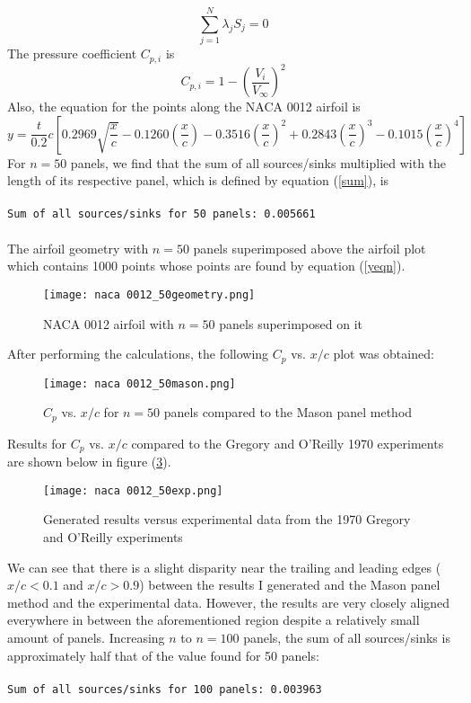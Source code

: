 \documentclass[12pt]{article}
\begin{document}
\begin{equation}
    \label{sum}
    \sum_{j = 1}^{N}\lambda_j S_j = 0
\end{equation}
The pressure coefficient $C_{p,i}$ is
\begin{equation}
    C_{p,i} = 1 - \left(\frac{V_i}{V_\infty} \right)^2
\end{equation}
Also, the equation for the points along the NACA 0012 airfoil is 
\begin{equation} \label{yeqn}
    y = \frac{t}{0.2}c\left[0.2969\sqrt{\frac{x}{c}} - 0.1260\left(\frac{x}{c} \right) - 0.3516\left(\frac{x}{c} \right)^2 + 0.2843\left(\frac{x}{c} \right)^3 - 0.1015\left(\frac{x}{c} \right)^4 \right]
\end{equation}
For $n = 50$ panels, we find that the sum of all sources/sinks multiplied with the length of its respective panel, which is defined by equation (\ref{sum}), is \\ \\
\texttt{Sum of all sources/sinks for 50 panels: 0.005661} \\ \\
The airfoil geometry with $n = 50$ panels superimposed above the airfoil plot which contains 1000 points whose points are found by equation (\ref{yeqn}).
\begin{figure}[H]
    \centering
    \texttt{[image: naca 0012\_50geometry.png]}
    \caption{NACA 0012 airfoil with $n = 50$ panels superimposed on it}
    \label{fig:50geo}
\end{figure}
\noindent After performing the calculations, the following $C_p$ vs. $x/c$ plot was obtained:
\begin{figure}[H]
    \centering
    \texttt{[image: naca 0012\_50mason.png]}
    \caption{$C_p$ vs. $x/c$ for $n = 50$ panels compared to the Mason panel method}
    \label{fig:mason50}
\end{figure}
\noindent Results for $C_p$ vs. $x/c$ compared to the Gregory and O'Reilly 1970 experiments are shown below in figure (\ref{50oreilly}).
\begin{figure}[H]
    \centering
    \texttt{[image: naca 0012\_50exp.png]}
    \caption{Generated results versus experimental data from the 1970 Gregory and O'Reilly experiments}
    \label{50oreilly}
\end{figure}
\noindent We can see that there is a slight disparity near the trailing and leading edges ($x/c < 0.1$ and $x/c > 0.9$) between the results I generated and the Mason panel method and the experimental data. However, the results are very closely aligned everywhere in between the aforementioned region despite a relatively small amount of panels. Increasing $n$ to $n = 100$ panels, the sum of all sources/sinks is approximately half that of the value found for 50 panels: \\ \\
\texttt{Sum of all sources/sinks for 100 panels: 0.003963} \\
\end{document}
